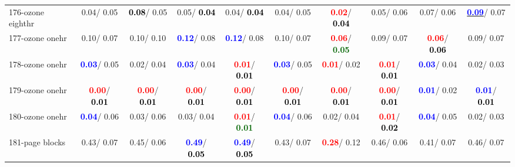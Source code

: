 \begin{table}[h]
\begin{center}
{\begin{tabular}{lc|c|c|c|c|c|c|c|c}
176-ozone eighthr &   0.04/  0.05 & \textcolor{black}{\textbf{  0.08}}/  0.05 &   0.05/\textcolor{black}{\textbf{  0.04}} &   0.04/\textcolor{black}{\textbf{  0.04}} &   0.04/  0.05 & \textcolor{red}{\textbf{  0.02}}/\textcolor{black}{\textbf{  0.04}} &   0.05/  0.06 &   0.07/  0.06 & \underline{\textcolor{blue}{\textbf{  0.09}}}/  0.07 \\
177-ozone onehr &   0.10/  0.07 &   0.10/  0.10 & \textcolor{blue}{\textbf{  0.12}}/  0.08 & \textcolor{blue}{\textbf{  0.12}}/  0.08 &   0.10/  0.07 & \textcolor{red}{\textbf{  0.06}}/\textcolor{darkgreen}{\textbf{  0.05}} &   0.09/  0.07 & \textcolor{red}{\textbf{  0.06}}/\textcolor{black}{\textbf{  0.06}} &   0.09/  0.07 \\
178-ozone onehr & \textcolor{blue}{\textbf{  0.03}}/  0.05 &   0.02/  0.04 & \textcolor{blue}{\textbf{  0.03}}/  0.04 & \textcolor{red}{\textbf{  0.01}}/\textcolor{black}{\textbf{  0.01}} & \textcolor{blue}{\textbf{  0.03}}/  0.05 & \textcolor{red}{\textbf{  0.01}}/  0.02 & \textcolor{red}{\textbf{  0.01}}/\textcolor{black}{\textbf{  0.01}} & \textcolor{blue}{\textbf{  0.03}}/  0.04 &   0.02/  0.03 \\
179-ozone onehr & \textcolor{red}{\textbf{  0.00}}/\textcolor{black}{\textbf{  0.01}} & \textcolor{red}{\textbf{  0.00}}/\textcolor{black}{\textbf{  0.01}} & \textcolor{red}{\textbf{  0.00}}/\textcolor{black}{\textbf{  0.01}} & \textcolor{red}{\textbf{  0.00}}/\textcolor{black}{\textbf{  0.01}} & \textcolor{red}{\textbf{  0.00}}/\textcolor{black}{\textbf{  0.01}} & \textcolor{red}{\textbf{  0.00}}/\textcolor{black}{\textbf{  0.01}} & \textcolor{red}{\textbf{  0.00}}/\textcolor{black}{\textbf{  0.01}} & \textcolor{blue}{\textbf{  0.01}}/  0.02 & \textcolor{blue}{\textbf{  0.01}}/\textcolor{black}{\textbf{  0.01}} \\
180-ozone onehr & \textcolor{blue}{\textbf{  0.04}}/  0.06 &   0.03/  0.06 &   0.03/  0.04 & \textcolor{red}{\textbf{  0.01}}/\textcolor{darkgreen}{\textbf{  0.01}} & \textcolor{blue}{\textbf{  0.04}}/  0.06 &   0.02/  0.04 & \textcolor{red}{\textbf{  0.01}}/\textcolor{black}{\textbf{  0.02}} & \textcolor{blue}{\textbf{  0.04}}/  0.05 &   0.02/  0.03 \\
181-page blocks &   0.43/  0.07 &   0.45/  0.06 & \textcolor{blue}{\textbf{  0.49}}/\textcolor{black}{\textbf{  0.05}} & \textcolor{blue}{\textbf{  0.49}}/\textcolor{black}{\textbf{  0.05}} &   0.43/  0.07 & \textcolor{red}{\textbf{  0.28}}/  0.12 &   0.46/  0.06 &   0.41/  0.07 &   0.46/  0.07 \\ \hline

\end{tabular}}
\end{center}
\end{table}
